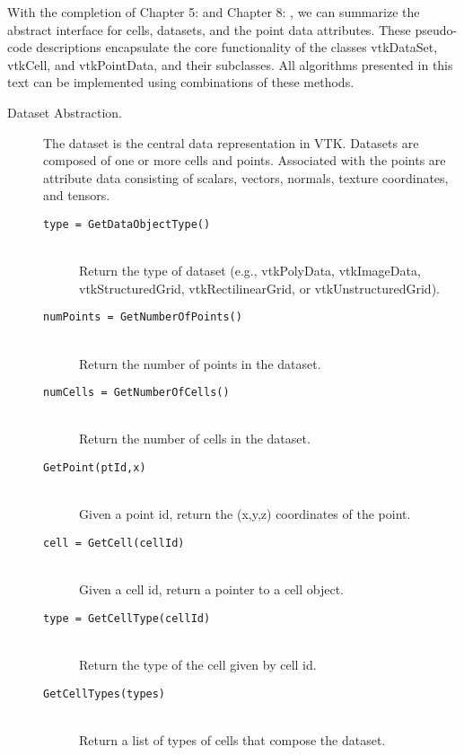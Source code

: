 With the completion of Chapter 5:  and Chapter 8: , we can summarize the abstract interface for cells, datasets, and the point data attributes. These pseudo-code descriptions encapsulate the core functionality of the classes vtkDataSet, vtkCell, and vtkPointData, and their subclasses. All algorithms presented in this text can be implemented using combinations of these methods.

\begin{description}
\item[Dataset Abstraction.] The dataset is the central data representation in VTK. Datasets are composed of one or more cells and points. Associated with the points are attribute data consisting of scalars, vectors, normals, texture coordinates, and tensors.
    \begin{description}

    \item[\texttt{type = GetDataObjectType()}] \hfill \\
    Return the type of dataset (e.g., vtkPolyData, vtkImageData, vtkStructuredGrid, vtkRectilinearGrid, or vtkUnstructuredGrid).

    \item[\texttt{numPoints = GetNumberOfPoints()}] \hfill \\
    Return the number of points in the dataset.

    \item[\texttt{numCells = GetNumberOfCells()}] \hfill \\
    Return the number of cells in the dataset.

    \item[\texttt{GetPoint(ptId,x)}] \hfill \\
    Given a point id, return the (x,y,z) coordinates of the point.

    \item[\texttt{cell = GetCell(cellId)}] \hfill \\
    Given a cell id, return a pointer to a cell object.

    \item[\texttt{type = GetCellType(cellId)}] \hfill \\
    Return the type of the cell given by cell id.

    \item[\texttt{GetCellTypes(types)}] \hfill \\
    Return a list of types of cells that compose the dataset.


\end{description}
\end{description}

